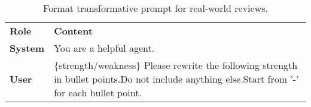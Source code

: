 \begin{table*}[ht]
\centering
\footnotesize
\renewcommand{\arraystretch}{1.3}
\begin{tabular}{p{1cm}p{11.5cm}}
\toprule[1.5pt]
\textbf{Role} & \textbf{Content} \\ 
\cmidrule[0.5pt](lr){1-2}
\textbf{System} & You are a helpful agent. \\ 
\midrule
\textbf{User} & \{strength/weakness\} \newline Please rewrite the following strength in bullet points.\newline Do not include anything else.\newline Start from '-' for each bullet point.\\
\bottomrule[1.5pt]
\end{tabular}
\caption{Format transformative prompt for real-world reviews.}
\label{tab:Review_Ground_Truth_Transform}
\end{table*}


